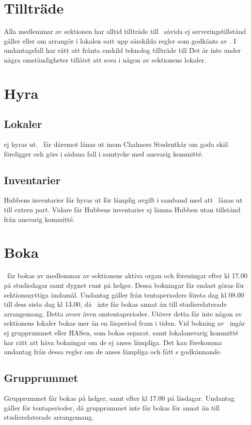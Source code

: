 \documentclass[11pt, includeaddress]{classes/cthit}
\begin{document}
\section{Tillträde}
Alla medlemmar av sektionen har alltid tillträde till \HUBBEN\ såvida ej serveringstillstånd gäller eller
om arrangör i lokalen satt upp särskilda regler som godkänts av \STYRIT{}. I undantagsfall har \STYRIT{} rätt
att frånta enskild teknolog tillträde till \HUBBEN\.
Det är inte under några omständigheter tillåtet att sova i någon av sektionens lokaler.


\section{Hyra}
\subsection{Lokaler}
\HUBBEN{} ej hyras ut. \HUBBEN\ får däremot lånas ut inom Chalmers Studentkår om goda skäl
föreligger och görs i sådana fall i samtycke med ansvarig kommitté.

\subsection{Inventarier}
Hubbens inventarier får hyras ut för lämplig avgift i samband med att \HUBBEN\ lånas ut till extern part.
Vidare får Hubbens inventarier ej lämna Hubben utan tillstånd från ansvarig kommitté.


\section{Boka}
\HUBBEN\ får bokas av medlemmar av sektionens aktiva organ och föreningar efter kl 17.00 på
studiedagar samt dygnet runt på helger. Dessa bokningar får endast göras för sektionsnyttiga ändamål.
Undantag gäller från tentaperioders första dag kl 08.00 till dess sista dag kl 13.00, då
\HUBBEN\ inte får bokas annat än till studierelaterade arrangemang. Detta avser även omtentaperioder.
Utöver detta får inte någon av sektionens lokaler bokas mer än en läsperiod fram i tiden.
Vid bokning av \HUBBEN\ ingår ej grupprummet eller HASen, som bokas separat. \STYRIT{} samt
lokalansvarig kommitté har rätt att häva bokningar om de ej anses lämpliga.
Det kan förekomma undantag från dessa regler om de anses lämpliga och fått \STYRIT{}s godkännande.

\subsection{Grupprummet}
Grupprummet får bokas på helger, samt efter kl 17.00 på läsdagar. Undantag gäller för tentaperioder, då
grupprummet inte får bokas för annat än till studierelaterade arrangemang.
\end{document}
